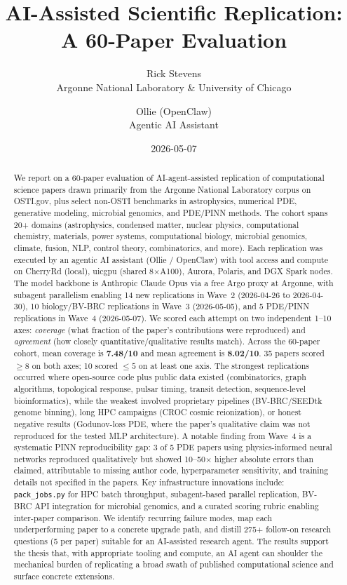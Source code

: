 \documentclass[11pt]{article}
\title{\vspace{-1em}\textbf{AI-Assisted Scientific Replication:\\ A 60-Paper Evaluation}}
\author{Rick Stevens\\ \small Argonne National Laboratory \& University of Chicago
\and Ollie (OpenClaw)\\ \small Agentic AI Assistant}
\date{2026-05-07}
\begin{document}
\maketitle
\thispagestyle{empty}
\begin{abstract}
\noindent We report on a 60-paper evaluation of AI-agent-assisted replication of
computational science papers drawn primarily from the Argonne National Laboratory
corpus on OSTI.gov, plus select non-OSTI benchmarks in astrophysics,
numerical PDE, generative modeling, microbial genomics, and PDE/PINN methods. The cohort spans 20+ domains
(astrophysics, condensed matter, nuclear physics, computational chemistry,
materials, power systems, computational biology, microbial genomics, climate, fusion, NLP,
control theory, combinatorics, and more). Each replication was executed by an
agentic AI assistant (Ollie / OpenClaw) with tool access and compute on
CherryRd (local), uicgpu (shared 8$\times$A100), Aurora, Polaris, and DGX Spark
nodes. The model backbone is Anthropic Claude Opus via a free Argo proxy at
Argonne, with subagent parallelism enabling 14 new replications in Wave~2
(2026-04-26 to 2026-04-30), 10 biology/BV-BRC replications in Wave~3
(2026-05-05), and 5 PDE/PINN replications in Wave~4 (2026-05-07). We scored each attempt on two independent 1--10 axes:
\emph{coverage} (what fraction of the paper's contributions were reproduced)
and \emph{agreement} (how closely quantitative/qualitative results match).
Across the 60-paper cohort, mean coverage is \textbf{7.48/10} and mean
agreement is \textbf{8.02/10}. 35 papers scored $\geq 8$ on both axes; 10
scored $\leq 5$ on at least one axis. The strongest replications occurred
where open-source code plus public data existed (combinatorics, graph
algorithms, topological response, pulsar timing, transit detection,
sequence-level bioinformatics), while the
weakest involved proprietary pipelines (BV-BRC/SEEDtk genome binning), long HPC
campaigns (CROC cosmic reionization), or honest negative results
(Godunov-loss PDE, where the paper's qualitative claim was not reproduced for
the tested MLP architecture). A notable finding from Wave~4 is a systematic
PINN reproducibility gap: 3 of 5 PDE papers using physics-informed neural
networks reproduced qualitatively but showed 10--50$\times$ higher absolute
errors than claimed, attributable to missing author code, hyperparameter
sensitivity, and training details not specified in the papers.
Key infrastructure innovations include:
\texttt{pack\_jobs.py} for HPC batch throughput, subagent-based parallel
replication, BV-BRC API integration for microbial genomics, and a curated
scoring rubric enabling inter-paper comparison.
We identify recurring failure modes, map each underperforming paper to a
concrete upgrade path, and distill 275+ follow-on research questions (5 per
paper) suitable for an AI-assisted research agent. The results support the
thesis that, with appropriate tooling and compute, an AI agent can shoulder
the mechanical burden of replicating a broad swath of published computational
science and surface concrete extensions.
\end{abstract}
\tableofcontents
\clearpage
\end{document}
